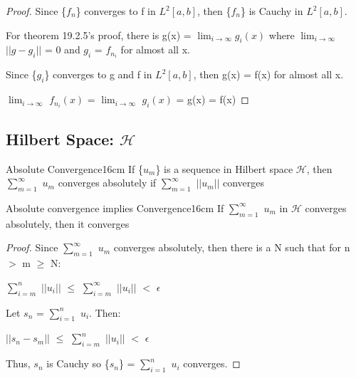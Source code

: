     \begin{proof}
        Since \{$f_n$\} converges to f in $L^2[a,b]$,
        then \{$f_n$\} is Cauchy in $L^2[a,b]$.

        For {\color{red} theorem 19.2.5}'s proof,
        there is g(x) = $\lim_{i \rightarrow \infty} g_i(x)$
        where $\lim_{i \rightarrow \infty}$ $||g-g_i||$ = 0 and
        $g_i$ = $f_{n_i}$ for almost all x.
        
        Since \{$g_i$\} converges to g and f in $L^2[a,b]$,
        then g(x) = f(x) for almost all x.

        \hspace{0.5cm}
        $\lim_{i \rightarrow \infty}$ $f_{n_i}(x)$
        = $\lim_{i \rightarrow \infty}$ $g_i(x)$
        = g(x) = f(x)
    \end{proof}

    \newpage





\subsection{ Hilbert Space: $\mathcal{H}$ }

    \begin{definition}{Absolute Convergence}{16cm}
        If \{$u_m$\} is a sequence in Hilbert space $\mathcal{H}$, then
        $\sum_{m=1}^{\infty}$ $u_m$ {\color{lblue} converges absolutely}
        if $\sum_{m=1}^{\infty}$ $||u_m||$ converges
    \end{definition}

    \vspace{0.5cm}



    \begin{wtheorem}{Absolute convergence implies Convergence}{16cm}
        If $\sum_{m=1}^{\infty}$ $u_m$ in $\mathcal{H}$ converges absolutely, then
        it converges
    \end{wtheorem}

    \begin{proof}
        Since $\sum_{m=1}^{\infty}$ $u_m$ converges absolutely,
        then there is a N such that for n $>$ m $\geq$ N:

        \hspace{0.5cm}
        $\sum_{i=m}^n$ $||u_i||$
        $\leq$ $\sum_{i=m}^{\infty}$ $||u_i||$
        $<$ $\epsilon$

        Let $s_n$ = $\sum_{i=1}^n$ $u_i$. Then:

        \hspace{0.5cm}
        $||s_n - s_m||$
        $\leq$ $\sum_{i=m}^n$ $||u_i||$
        $<$ $\epsilon$

        Thus, $s_n$ is Cauchy so \{$s_n$\} = $\sum_{i=1}^n$ $u_i$ converges.
    \end{proof}

